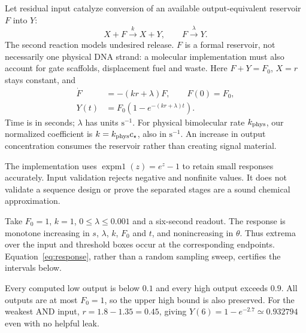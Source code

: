 Let residual input catalyze conversion of an available output-equivalent
reservoir $F$ into $Y$:
\begin{equation}
 X+F\xrightarrow{k}X+Y,\qquad F\xrightarrow{\lambda}Y.
 \label{eq:restorecrn}
\end{equation}
The second reaction models undesired release. $F$ is a formal reservoir, not
necessarily one physical DNA strand: a molecular implementation must also
account for gate scaffolds, displacement fuel and waste. Here $F+Y=F_0$,
$X=r$ stays constant, and
\begin{align}
 \dot F&=-(kr+\lambda)F,\qquad F(0)=F_0,\\
 Y(t)&=F_0\left(1-e^{-(kr+\lambda)t}\right).
 \label{eq:response}
\end{align}
Time is in seconds; $\lambda$ has units $\mathrm{s}^{-1}$.
For physical bimolecular rate $k_{\rm phys}$, our normalized coefficient is
$k=k_{\rm phys}c_\star$, also in $\mathrm{s}^{-1}$. An increase in output
concentration consumes the reservoir rather than creating signal material.


The implementation uses $\operatorname{expm1}(z)=e^z-1$ to retain small responses
accurately. Input validation rejects negative and nonfinite values. It does not
validate a sequence design or prove the separated stages are a sound chemical
approximation.

Take $F_0=1$, $k=1$, $0\leq\lambda\leq0.001$ and a six-second readout.
The response is monotone increasing in $s$, $\lambda$, $k$, $F_0$ and $t$,
and nonincreasing in $\theta$. Thus extrema over the input and threshold boxes
occur at the corresponding endpoints. Equation~\ref{eq:response}, rather than
a random sampling sweep, certifies the intervals below.

\begin{center}\end{center}

Every computed low output is below $0.1$ and every high output exceeds $0.9$.
All outputs are at most $F_0=1$, so the upper high bound is also preserved.
For the weakest AND input, $r=1.8-1.35=0.45$, giving
$Y(6)=1-e^{-2.7}\simeq0.932794$ even with no helpful leak.


